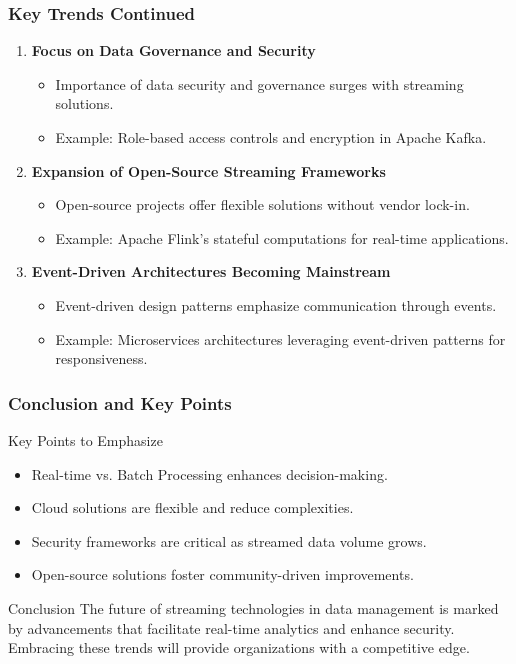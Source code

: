 \documentclass[aspectratio=169]{beamer}
\begin{document}
\begin{frame}[fragile]
    \frametitle{Key Trends Continued}
    \begin{enumerate}[resume]
        \item \textbf{Focus on Data Governance and Security}
        \begin{itemize}
            \item Importance of data security and governance surges with streaming solutions.
            \item Example: Role-based access controls and encryption in Apache Kafka.
        \end{itemize}
        
        \item \textbf{Expansion of Open-Source Streaming Frameworks}
        \begin{itemize}
            \item Open-source projects offer flexible solutions without vendor lock-in.
            \item Example: Apache Flink's stateful computations for real-time applications.
        \end{itemize}

        \item \textbf{Event-Driven Architectures Becoming Mainstream}
        \begin{itemize}
            \item Event-driven design patterns emphasize communication through events.
            \item Example: Microservices architectures leveraging event-driven patterns for responsiveness.
        \end{itemize}
    \end{enumerate}
\end{frame}

\begin{frame}[fragile]
    \frametitle{Conclusion and Key Points}
    \begin{block}{Key Points to Emphasize}
        \begin{itemize}
            \item Real-time vs. Batch Processing enhances decision-making.
            \item Cloud solutions are flexible and reduce complexities.
            \item Security frameworks are critical as streamed data volume grows.
            \item Open-source solutions foster community-driven improvements.
        \end{itemize}
    \end{block}
    \begin{block}{Conclusion}
        The future of streaming technologies in data management is marked by advancements 
        that facilitate real-time analytics and enhance security. Embracing these trends will 
        provide organizations with a competitive edge.
    \end{block}
\end{frame}
\end{document}
